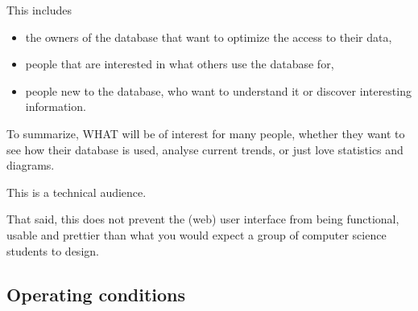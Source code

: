 This includes
\begin{itemize}
  \item the owners of the database that want to optimize the access to
  	their data,
  	
  \item people that are interested in what others use the database for,

  
  \item people new to the database, who want to understand it or discover interesting information.

\end{itemize}
To summarize, WHAT will be of interest for many people, 
whether they want to see how their database is used, analyse current trends,
or just love statistics and diagrams.

%   
%   




This is a technical audience.
 
That said, this does not prevent the (web) user interface from being functional,
usable and prettier than what you would expect a group of 
computer science students to design.
 

\subsection{Operating conditions}

